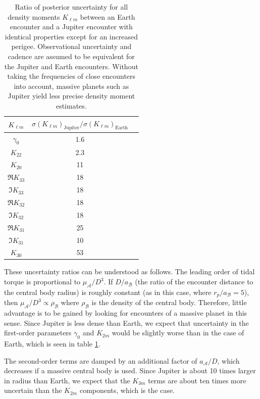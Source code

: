 \documentclass[fleqn,usenatbib]{mnras}
\begin{document}
\begin{table}
  \centering
  \begin{tabular}{c|cc}
    \hline 
    $K_{\ell m}$ & $\sigma(K_{\ell m})_\text{Jupiter}/\sigma(K_{\ell m})_\text{Earth}$\\ \hline 
    $\gamma_0$ & 1.6 \\
    $K_{22}$ & 2.3 \\
    $K_{20}$ & 11 \\
    $\Re K_{33}$ & 18 \\
    $\Im K_{33}$ & 18 \\
    $\Re K_{32}$ & 18 \\
    $\Im K_{32}$ & 18 \\
    $\Re K_{31}$ & 25 \\
    $\Im K_{31}$ & 10 \\
    $K_{30}$ & 53 \\ \hline
  \end{tabular}
  \caption{Ratio of posterior uncertainty for all density moments $K_{\ell m}$ between an Earth encounter and a Jupiter encounter with identical properties except for an increased perigee. Observational uncertainty and cadence are assumed to be equivalent for the Jupiter and Earth encounters. Without taking the frequencies of close encounters into account, massive planets such as Jupiter yield less precise density moment estimates.}
  \label{tab:jupiter-uncertainty}
\end{table}

These uncertainty ratios can be understood as follows. The leading order of tidal torque is proportional to $\mu_\mathcal{A} / D^3$. If $D/a_\mathcal{B}$ (the ratio of the encounter distance to the central body radius) is roughly constant (as in this case, where $r_p/a_\mathcal{B}=5$), then $\mu_\mathcal{A} / D^3 \propto \rho_\mathcal{B}$ where $\rho_\mathcal{B}$ is the density of the central body. Therefore, little advantage is to be gained by looking for encounters of a massive planet in this sense. Since Jupiter is less dense than Earth, we expect that uncertainty in the first-order parameters $\gamma_0$ and $K_{2m}$ would be slightly worse than in the case of Earth, which is seen in table \ref{tab:jupiter-uncertainty}.

The second-order terms are damped by an additional factor of $a_\mathcal{A}/D$, which decreases if a massive central body is used. Since Jupiter is about 10 times larger in radius than Earth, we expect that the $K_{3m}$ terms are about ten times more uncertain than the $K_{2m}$ components, which is the case.
\end{document}
